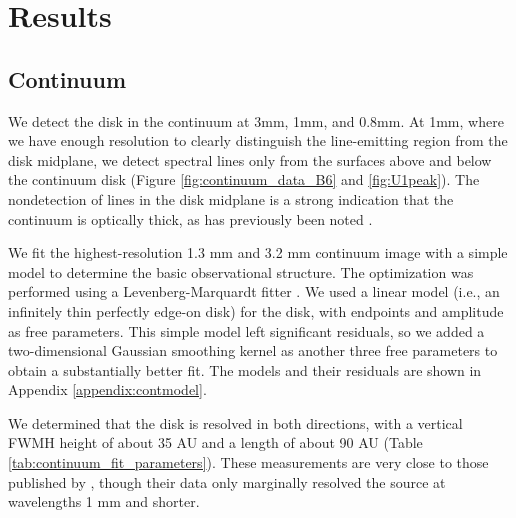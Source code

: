 \documentclass[twocolumn]{aastex61}
\newcommand{\sourcei}{SrcI}
\begin{document}


\section{Results}
\label{sec:results}

\subsection{Continuum}
We detect the disk in the continuum at 3mm, 1mm, and 0.8mm.  At 1mm, where we
have enough resolution to clearly distinguish the line-emitting region from the
disk midplane, we detect spectral lines only from the surfaces above and below the
continuum disk (Figure \ref{fig:continuum_data_B6} and \ref{fig:U1peak}).
The nondetection of lines in the disk midplane is a strong indication that the
continuum is optically thick, as has previously been noted
\citep[e.g.][]{Plambeck2016a}.


We fit the highest-resolution 1.3 mm and 3.2 mm continuum image with a simple
model to determine the basic
observational structure.
The optimization was performed using a Levenberg-Marquardt
fitter \citep{Newville2014a}. 
We used a linear model (i.e., an infinitely thin
perfectly edge-on disk) for the disk, with endpoints and amplitude as free parameters.
This simple model left significant residuals, so we added a two-dimensional
Gaussian smoothing kernel as another three free parameters to obtain a
substantially better fit.
The models and their residuals
are shown in Appendix \ref{appendix:contmodel}.

We determined that the disk is resolved in both
directions, with a vertical FWMH height of about 35 AU and a length of about
90 AU (Table \ref{tab:continuum_fit_parameters}).  These measurements
are very close to those published by \citet{Plambeck2016a}, though their data
only marginally resolved the source at wavelengths 1 mm and shorter.
\end{document}
